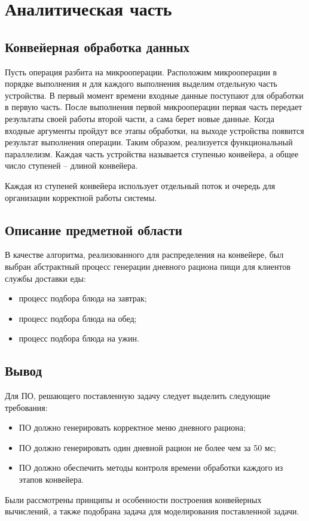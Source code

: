 \chapter{Аналитическая часть}

\section{Конвейерная обработка данных}
Пусть операция разбита на микрооперации. Расположим микрооперации в порядке выполнения и для каждого выполнения выделим отдельную часть устройства. В первый момент времени входные данные поступают для обработки в первую часть. После выполнения первой микрооперации первая часть передает результаты своей работы второй части, а сама берет новые данные. Когда входные аргументы пройдут все этапы обработки, на выходе устройства появится результат выполнения операции. Таким образом, реализуется функциональный параллелизм. Каждая часть устройства называется ступенью конвейера, а общее число ступеней – длиной конвейера.

Каждая из ступеней конвейера использует отдельный поток и очередь для организации корректной работы системы.

\section{Описание предметной области}
В качестве алгоритма, реализованного для распределения на конвейере, был выбран абстрактный процесс генерации дневного рациона пищи для клиентов службы доставки еды:
\begin{itemize}
	\item процесс подбора блюда на завтрак;
	\item процесс подбора блюда на обед;
	\item процесс подбора блюда на ужин.
\end{itemize}

\section{Вывод}

Для ПО, решающего поставленную задачу следует выделить следующие требования:
\begin{itemize}
	\item ПО должно генерировать корректное меню дневного рациона;
	\item ПО должно генерировать один дневной рацион не более чем за 50 мс;
	\item ПО должно обеспечить методы контроля времени обработки каждого из этапов конвейера.
\end{itemize}

Были рассмотрены принципы и особенности построения конвейерных вычислений, а также подобрана задача для моделирования поставленной задачи. 


